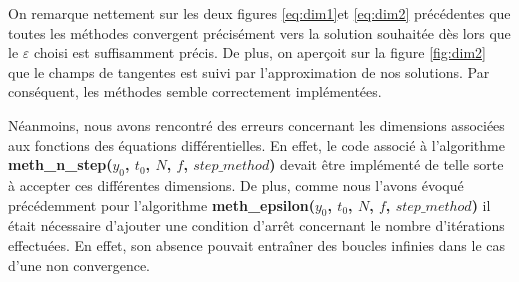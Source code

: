 On remarque nettement sur les deux figures \ref{eq:dim1}et \ref{eq:dim2} précédentes que toutes les méthodes convergent précisément vers la solution souhaitée dès lors que le $\varepsilon$ choisi est suffisamment précis.
De plus, on aperçoit sur la figure \ref{fig:dim2} que le champs de tangentes est suivi par l'approximation de nos solutions. Par conséquent, les méthodes semble correctement implémentées.

Néanmoins, nous avons rencontré des erreurs concernant les dimensions associées aux fonctions des équations différentielles. En effet, le code associé à l'algorithme \textbf{meth\_n\_step($y_0$, $t_0$, $N$, $f$, $step\_method$)} devait être implémenté de telle sorte à accepter ces différentes dimensions. De plus, comme nous l'avons évoqué précédemment pour l'algorithme \textbf{meth\_epsilon($y_0$, $t_0$, $N$, $f$, $step\_method$)} il était nécessaire d'ajouter une condition d'arrêt concernant le nombre d'itérations effectuées. En effet, son absence pouvait entraîner des boucles infinies dans le cas d'une non convergence.